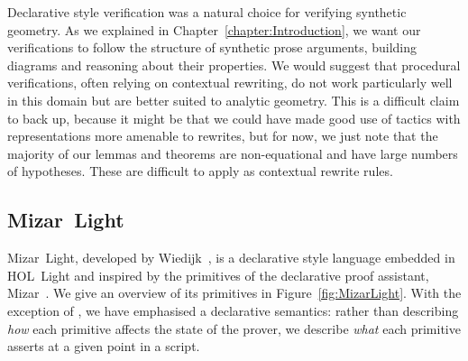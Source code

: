 Declarative style verification was a natural choice for verifying synthetic geometry. As we explained in Chapter~\ref{chapter:Introduction}, we want our verifications to follow the structure of synthetic prose arguments, building diagrams and reasoning about their properties. We would suggest that procedural verifications, often relying on contextual rewriting, do not work particularly well in this domain but are better suited to analytic geometry. This is a difficult claim to back up, because it might be that we could have made good use of tactics with representations more amenable to rewrites, but for now, we just note that the majority of our lemmas and theorems are non-equational and have large numbers of hypotheses. These are difficult to apply as contextual rewrite rules.

\subsection{Mizar~Light}\label{sec:MizarLight}
Mizar~Light, developed by Wiedijk~\cite{MizarLight}, is a declarative style language embedded in HOL~Light and inspired by the primitives of the declarative proof assistant, Mizar~\cite{MizarMathematicalVernacular}. We give an overview of its primitives in Figure~\ref{fig:MizarLight}. With the exception of , we have emphasised a declarative semantics: rather than describing \emph{how} each primitive affects the state of the prover, we describe \emph{what} each primitive asserts at a given point in a script.

